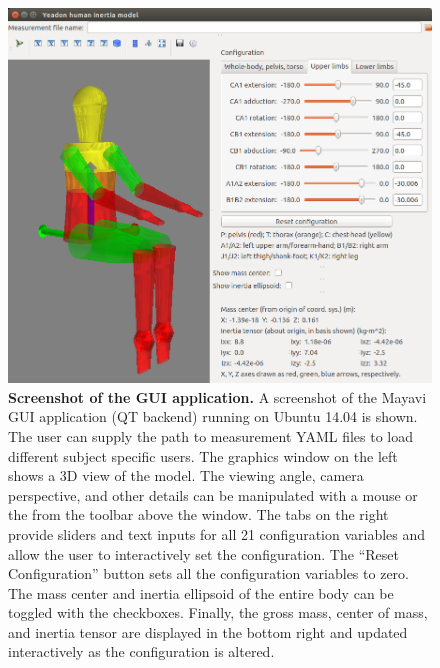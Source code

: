 \documentclass[10pt]{article}
\begin{document}
\begin{figure}[!ht]
  \begin{center}
    \includegraphics[width=6in]{figfactory/gui-screenshot.png}
  \end{center}
  \caption{
    {\bf Screenshot of the GUI application.} A screenshot of the Mayavi GUI
    application (QT backend) running on Ubuntu 14.04 is shown. The user can
    supply the path to measurement YAML files to load different subject
    specific users. The graphics window on the left shows a 3D view of the
    model. The viewing angle, camera perspective, and other details can be
    manipulated with a mouse or the from the toolbar above the window. The tabs
    on the right provide sliders and text inputs for all 21 configuration
    variables and allow the user to interactively set the configuration. The
    ``Reset Configuration'' button sets all the configuration variables to
    zero. The mass center and inertia ellipsoid of the entire body can be
    toggled with the checkboxes. Finally, the gross mass, center of mass, and
    inertia tensor are displayed in the bottom right and updated interactively
    as the configuration is altered.
  }
  \label{fig:gui}
\end{figure}
\end{document}
